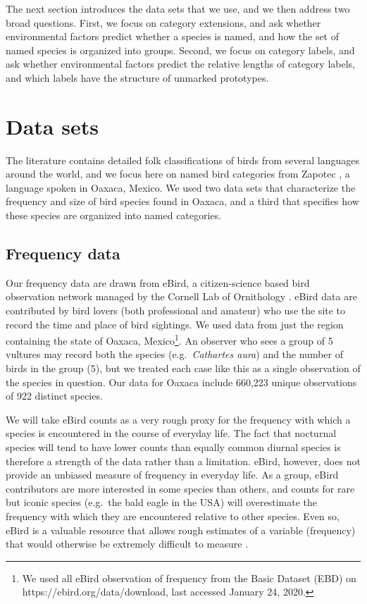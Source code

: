 \documentclass[10pt,letterpaper]{article}
\begin{document}
The next section introduces the data sets that we use, and we then address two broad questions. First, we focus on category extensions, and ask whether environmental factors predict whether a species is named, and how the set of named species is organized into groups. Second, we focus on category labels, and ask whether environmental factors predict the relative lengths of category labels, and which labels have the structure of unmarked prototypes. 


\section{Data sets}

The literature contains detailed folk classifications of birds from several languages around the world, and we focus here on named bird categories from Zapotec \cite{hunn2008zapotec}, a language spoken in Oaxaca, Mexico.  We used two data sets that characterize the frequency and size of bird species found in Oaxaca, and a third that specifies how these species are organized into named categories.

\subsection{Frequency data}

Our frequency data are drawn from eBird, a citizen-science based bird observation network managed by the Cornell Lab of Ornithology \cite{sullivan2009ebird}.  eBird data are contributed by bird lovers (both professional and amateur) who use the site to record the time and place of bird sightings.  We used data from just the region containing the state of Oaxaca, Mexico\footnote{We used all eBird observation of frequency from the Basic Dataset (EBD) on https://ebird.org/data/download, last accessed January 24, 2020.}. An observer who sees a group of 5 vultures may record both the species (e.g.\ \emph{Cathartes aura}) and the number of birds in the group (5), but we treated each case like this as a single observation of the species in question. Our data for Oaxaca include 660,223 unique observations of 922 distinct species. 

We will take eBird counts as a very rough proxy for the frequency with which a species is encountered in the course of everyday life. The fact that nocturnal species will tend to have lower counts than equally common diurnal species is therefore a strength of the data rather than a limitation. eBird, however,  does not provide an unbiased measure of frequency in everyday life. As a group, eBird contributors are more interested in some species than others, and counts for rare but iconic species (e.g.\ the bald eagle in the USA) will overestimate the frequency with which they are encountered relative to other species. Even so, eBird is a valuable resource that allows rough estimates of a variable (frequency) that would otherwise be extremely difficult to measure \cite{kosmala2016assessing}.  
\end{document}

